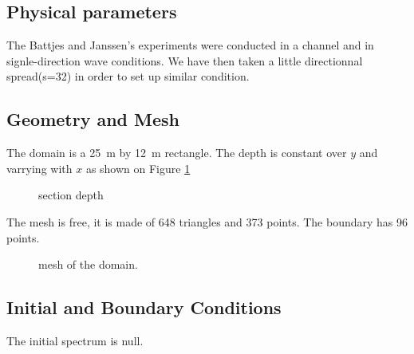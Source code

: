 %
%
%

%
%
\subsection{Physical parameters}
%
The Battjes and Janssen's experiments were conducted in a channel and in
signle-direction wave conditions. We have then taken a little directionnal
spread(s=32) in order to set up similar condition.

%
%
\subsection{Geometry and Mesh}
%
The domain is a 25~m by 12~m rectangle. The depth is constant over $y$ and
varrying with $x$ as shown on Figure \ref{bathybj}

\begin{figure} [!h]
\centering
{}
 \caption{section depth}
\label{bathybj}
\end{figure}

The mesh is free, it is made of 648 triangles and 373 points. The boundary has
96 points.
%
%

\begin{figure} [!h]
\centering
{}
\caption{mesh of the domain.}
\label{meshbj}
\end{figure}
\subsection{Initial and Boundary Conditions}
The initial spectrum is null.

